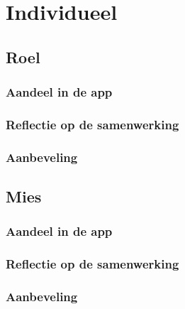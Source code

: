 \documentclass[dutch]{report}
\begin{document}
	\newpage
	\section{Individueel}
	
	\subsection{Roel}

	\subsubsection{Aandeel in de app}
	\subsubsection{Reflectie op de samenwerking}
	\subsubsection{Aanbeveling}
	
	\subsection{Mies}

	\subsubsection{Aandeel in de app}
	\subsubsection{Reflectie op de samenwerking}
	\subsubsection{Aanbeveling}
\end{document}
